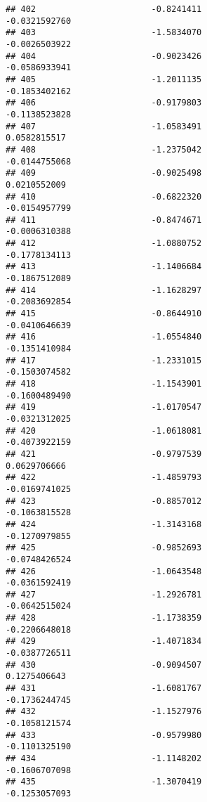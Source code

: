 \documentclass[
]{article}
\begin{document}
\begin{verbatim}
## 402                       -0.8241411                         -0.0321592760
## 403                       -1.5834070                         -0.0026503922
## 404                       -0.9023426                         -0.0586933941
## 405                       -1.2011135                         -0.1853402162
## 406                       -0.9179803                         -0.1138523828
## 407                       -1.0583491                          0.0582815517
## 408                       -1.2375042                         -0.0144755068
## 409                       -0.9025498                          0.0210552009
## 410                       -0.6822320                         -0.0154957799
## 411                       -0.8474671                         -0.0006310388
## 412                       -1.0880752                         -0.1778134113
## 413                       -1.1406684                         -0.1867512089
## 414                       -1.1628297                         -0.2083692854
## 415                       -0.8644910                         -0.0410646639
## 416                       -1.0554840                         -0.1351410984
## 417                       -1.2331015                         -0.1503074582
## 418                       -1.1543901                         -0.1600489490
## 419                       -1.0170547                         -0.0321312025
## 420                       -1.0618081                         -0.4073922159
## 421                       -0.9797539                          0.0629706666
## 422                       -1.4859793                         -0.0169741025
## 423                       -0.8857012                         -0.1063815528
## 424                       -1.3143168                         -0.1270979855
## 425                       -0.9852693                         -0.0748426524
## 426                       -1.0643548                         -0.0361592419
## 427                       -1.2926781                         -0.0642515024
## 428                       -1.1738359                         -0.2206648018
## 429                       -1.4071834                         -0.0387726511
## 430                       -0.9094507                          0.1275406643
## 431                       -1.6081767                         -0.1736244745
## 432                       -1.1527976                         -0.1058121574
## 433                       -0.9579980                         -0.1101325190
## 434                       -1.1148202                         -0.1606707098
## 435                       -1.3070419                         -0.1253057093

\end{verbatim}
\end{document}

